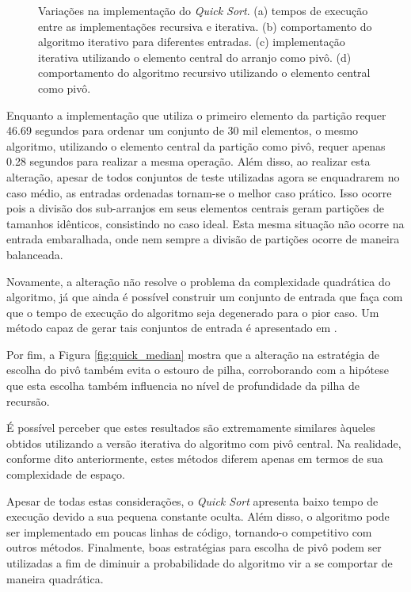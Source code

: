 \documentclass[12pt]{article}
\begin{document}
\begin{figure}[H]
    \caption{Variações na implementação do \textit{Quick Sort}. (a) tempos de execução entre as implementações recursiva e iterativa. (b) comportamento do algoritmo iterativo para diferentes entradas. (c) implementação iterativa utilizando o elemento central do arranjo como pivô. (d) comportamento do algoritmo recursivo utilizando o elemento central como pivô.}%
\end{figure}

Enquanto a implementação que utiliza o primeiro elemento da partição requer 46.69 segundos para ordenar um conjunto de 30 mil elementos, o mesmo algoritmo, utilizando o elemento central da partição como pivô, requer apenas 0.28 segundos para realizar a mesma operação. Além disso, ao realizar esta alteração, apesar de todos conjuntos de teste  utilizadas agora se enquadrarem no caso médio, as entradas ordenadas tornam-se o melhor caso prático. Isso ocorre pois a divisão dos sub-arranjos em seus elementos centrais geram partições de tamanhos idênticos, consistindo no caso ideal. Esta mesma situação não ocorre na entrada embaralhada, onde nem sempre a divisão de partições ocorre de maneira balanceada.

Novamente, a alteração não resolve o problema da complexidade quadrática do algoritmo, já que ainda é possível construir um conjunto de entrada que faça com que o tempo de execução do algoritmo seja degenerado para o pior caso. Um método capaz de gerar tais conjuntos de entrada é apresentado em \cite{quicksort_killer}.

Por fim, a Figura \ref{fig:quick_median} mostra que a alteração na estratégia de escolha do pivô também evita o estouro de pilha, corroborando com a hipótese que esta escolha também influencia no nível de profundidade da pilha de recursão.

É possível perceber que estes resultados são extremamente similares àqueles obtidos utilizando a versão iterativa do algoritmo com pivô central. Na realidade, conforme dito anteriormente, estes métodos diferem apenas em termos de sua complexidade de espaço.

Apesar de todas estas considerações, o \textit{Quick Sort} apresenta baixo tempo de execução devido a sua pequena constante oculta. Além disso, o algoritmo pode ser implementado em poucas linhas de código, tornando-o competitivo com outros métodos. Finalmente, boas estratégias para escolha de pivô podem ser utilizadas a fim de diminuir a probabilidade do algoritmo vir a se comportar de maneira quadrática.
\end{document}
